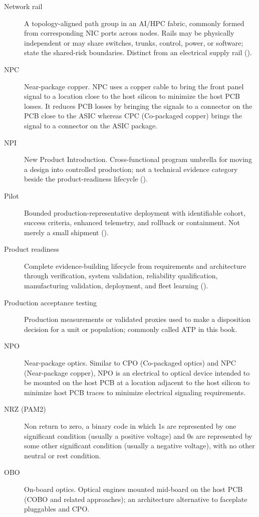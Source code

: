 \begin{description}
\item[Network rail] A topology-aligned path group in an AI/HPC fabric, commonly formed from corresponding NIC ports across nodes. Rails may be physically independent or may share switches, trunks, control, power, or software; state the shared-risk boundaries. Distinct from an electrical supply rail ().
\item[NPC] Near-package copper. NPC uses a copper cable to bring the front panel signal to a location close to the host silicon to minimize the host PCB losses. It reduces PCB losses by bringing the signals to a connector on the PCB close to the ASIC whereas CPC (Co-packaged copper) brings the signal to a connector on the ASIC package.
\item[NPI] New Product Introduction. Cross-functional program umbrella for moving a design into controlled production; not a technical evidence category beside the product-readiness lifecycle ().
\item[Pilot] Bounded production-representative deployment with identifiable cohort, success criteria, enhanced telemetry, and rollback or containment. Not merely a small shipment ().
\item[Product readiness] Complete evidence-building lifecycle from requirements and architecture through verification, system validation, reliability qualification, manufacturing validation, deployment, and fleet learning ().
\item[Production acceptance testing] Production measurements or validated proxies used to make a disposition decision for a unit or population; commonly called ATP in this book.
\item[NPO] Near-package optics. Similar to CPO (Co-packaged optics) and NPC (Near-package copper), NPO is an electrical to optical device intended to be mounted on the host PCB at a location adjacent to the host silicon to minimize host PCB traces to minimize electrical signaling requirements.
\item[NRZ (PAM2)] Non return to zero, a binary code in which 1s are represented by one significant condition (usually a positive voltage) and 0s are represented by some other significant condition (usually a negative voltage), with no other neutral or rest condition.
\item[OBO] On-board optics. Optical engines mounted mid-board on the host PCB (COBO and related approaches); an architecture alternative to faceplate pluggables and CPO.

\end{description}
